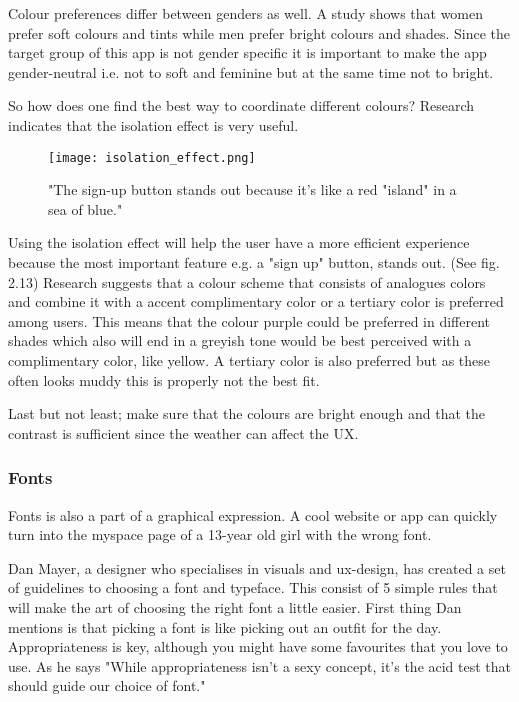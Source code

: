 Colour preferences differ between genders as well. A study shows that women prefer soft colours and tints while men prefer bright colours and shades. \cite{ColorMeaning} Since the target group of this app is not gender specific it is important to make the app gender-neutral i.e. not to soft and feminine but at the same time not to bright. 

So how does one find the best way to coordinate different colours? Research indicates that the isolation effect is very useful.

\begin{figure}[H]
\centering
\texttt{[image: isolation\_effect.png]}
\caption{"The sign-up button stands out because it's like a red "island" in a sea of blue." \cite{ColorMeaning}}
\end{figure}

Using the isolation effect will help the user have a more efficient experience because the most important feature e.g. a "sign up" button, stands out. \cite{ColorMeaning} (See fig. 2.13)%
Research suggests that a colour scheme that consists of analogues colors and combine it with a accent complimentary color or a tertiary color is preferred among users. \cite{ColorMeaning} 
This means that the colour purple could be preferred in different shades which also will end in a greyish tone would be best perceived with a complimentary color, like yellow. A tertiary color is also preferred but as these often looks muddy this is properly not the best fit.

Last but not least; make sure that the colours are bright enough and that the contrast is sufficient since the weather can affect the UX. \cite{Graphic}

\subsubsection{Fonts}
Fonts is also a part of a graphical expression. A cool website or app can quickly turn into the myspace page of a 13-year old girl with the wrong font.

Dan Mayer, a designer who specialises in visuals and ux-design, has created a set of guidelines to choosing a font and typeface. This consist of 5 simple rules that will make the art of choosing the right font a little easier. First thing Dan mentions is that picking a font is like picking out an outfit for the day. Appropriateness is key, although you might have some favourites that you love to use. As he says "While appropriateness isn't a sexy concept, it's the acid test that should guide our choice of font." \cite{Font}

